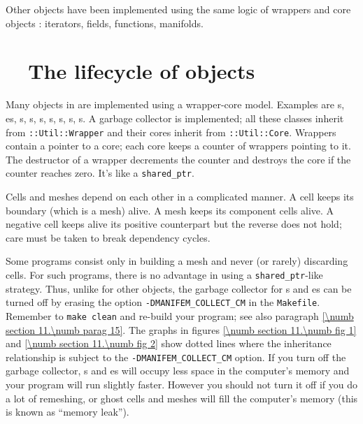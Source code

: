 Other objects have been implemented using the same logic of wrappers and core objects :
iterators, fields, functions, manifolds.

\vfil\break


\section{~~The lifecycle of objects}\label{\numb section 11.\numb parag 5}

Many objects in {\maniFEM} are implemented using a wrapper-core model.
Examples are {\small\tt{}}s, {\small\tt{}}es,
{\small\tt{}}s, {\small\tt{}}s, {\small\tt{}}s,
{\small\tt{}}s, {\small\tt{}}s, {\small\tt{}}s,%
s.
A garbage collector is implemented; all these classes inherit from
{\small\tt {}::Util::Wrapper} and
their cores inherit from {\small\tt {}::Util::Core}.
Wrappers contain a pointer to a core; each core keeps a counter of wrappers pointing to it.
The destructor of a wrapper decrements the counter and destroys the core if the counter
reaches zero.
It's like a {\small\tt shared\_ptr}.

Cells and meshes depend on each other in a complicated manner.
A cell keeps its boundary (which is a mesh) alive.
A mesh keeps its component cells alive.
A negative cell keeps alive its positive counterpart but the reverse does not hold;
care must be taken to break dependency cycles.

Some programs consist only in building a mesh and never (or rarely) discarding cells.
For such programs, there is no advantage in using a {\small\tt shared\_ptr}-like strategy.
Thus, unlike for other {\maniFEM} objects, the garbage collector for {\small\tt {}}s and
{\small\tt {}}es can be turned off by erasing the option
{\small\tt -DMANIFEM\_COLLECT\_CM} in the {\small\tt Makefile}.
Remember to {\small\tt make clean} and re-build your program;
see also paragraph \ref{\numb section 11.\numb parag 15}.
The graphs in figures \ref{\numb section 11.\numb fig 1} and \ref{\numb section 11.\numb fig 2}
show dotted lines where the inheritance relationship is subject to the
{\small\tt -DMANIFEM\_COLLECT\_CM} option.
If you turn off the garbage collector, {\small\tt {}}s and {\small\tt {}}es
will occupy less space in the computer's memory and your program will run slightly faster.
However you should not turn it off if you do a lot of remeshing,
or ghost cells and meshes will fill the computer's memory (this is known as ``memory leak'').

